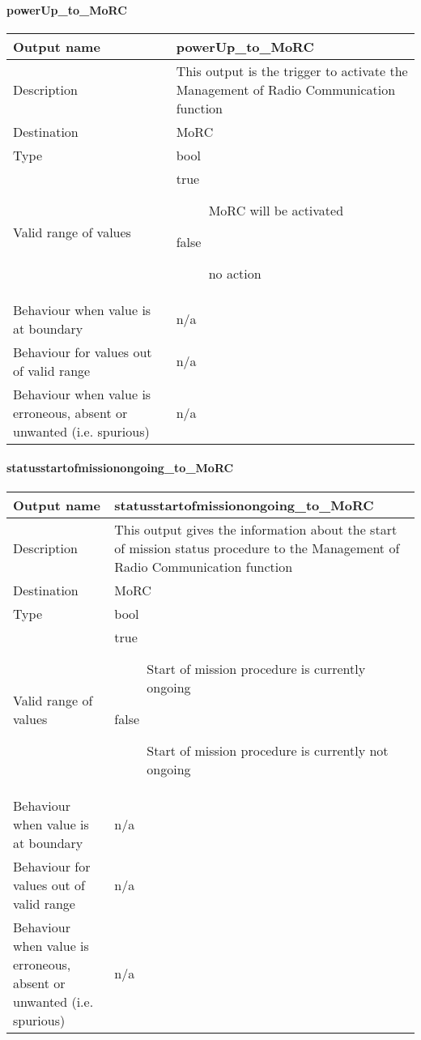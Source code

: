 \paragraph{powerUp\_to\_MoRC}

\begin{longtable}{p{}p{}}
\toprule
Output name				& powerUp\_to\_MoRC \\
\midrule
Description				& This output is the trigger to activate the Management of Radio Communication function \\
\midrule
Destination				& MoRC \\ 
\midrule
Type					& bool \\
\midrule
Valid range of values	& \begin{description}
\item[true]MoRC will be activated 
\item[false]no action
\end{description} \\
\midrule
Behaviour when value is at boundary	& n/a \\
\midrule
Behaviour for values out of valid range	& n/a \\
\midrule
Behaviour when value is erroneous, absent or unwanted (i.e. spurious) & n/a \\
\bottomrule
\end{longtable}

\paragraph{statusstartofmissionongoing\_to\_MoRC}

\begin{longtable}{p{}p{}}
\toprule
Output name				& statusstartofmissionongoing\_to\_MoRC \\
\midrule
Description				& This output gives the information about the start of mission status procedure to the Management of Radio Communication function \\
\midrule
Destination				& MoRC \\ 
\midrule
Type					& bool \\
\midrule
Valid range of values	& \begin{description}
\item[true]Start of mission procedure is currently ongoing
\item[false]Start of mission procedure is currently not ongoing
\end{description} \\
\midrule
Behaviour when value is at boundary	& n/a \\
\midrule
Behaviour for values out of valid range	& n/a \\
\midrule
Behaviour when value is erroneous, absent or unwanted (i.e. spurious) & n/a \\
\bottomrule
\end{longtable}

